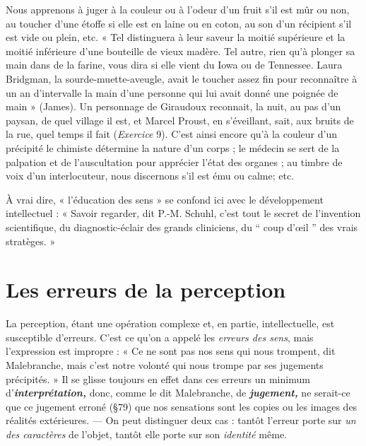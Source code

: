 \vspace{0.24cm}
{\footnotesize 
Nous apprenons à juger à la couleur ou à l’odeur d’un fruit s’il est mûr ou
non, au toucher d’une étoffe si elle est en laine ou en coton, au son d’un
récipient s’il est vide ou plein, etc. « Tel distinguera à leur saveur la moitié
supérieure et la moitié inférieure d’une bouteille de vieux madère. Tel autre,
rien qu’à plonger sa main dans de la farine, vous dira si elle vient du Iowa
ou de Tennessee. Laura Bridgman, la sourde-muette-aveugle, avait le toucher
assez fin pour reconnaître à un an d'intervalle la main d’une personne
qui lui avait donné une poignée de main » (James). Un personnage de
Giraudoux reconnait, la nuit, au pas d’un paysan, de quel village il est, et
Marcel Proust, en s’éveillant, sait, aux bruits de la rue, quel temps il fait
({\it Exercice} 9). C'est ainsi encore qu’à la couleur d’un précipité le chimiste
détermine la nature d’un corps ; le médecin se sert de la palpation et de
l’auscultation pour apprécier l'état des organes ; au timbre de voix d’un
interlocuteur, nous discernons s’il est ému ou calme; etc.}
\vspace{0.31cm}

À vrai dire, « l’éducation des sens » se confond ici avec le développement
intellectuel : « Savoir regarder, dit P.-M. Schuhl, c’est tout
le secret de l’invention scientifique, du diagnostic-éclair des grands
cliniciens, du “ coup d'œil ” des vrais stratèges. »

\section{Les erreurs de la perception}%
La perception, étant une
opération complexe et, en partie, intellectuelle, est susceptible d’erreurs.
C’est ce qu’on a appelé les {\it erreurs des sens}, mais l’expression
est impropre : « Ce ne sont pas nos sens qui nous trompent, dit
Malebranche, mais c'est notre volonté qui nous trompe par ses
jugements précipités. » Il se glisse toujours en effet dans ces erreurs un
minimum d'\textbf{\textit {interprétation,}} donc, comme le dit Malebranche, de
\textbf{\textit {jugement,}} ne serait-ce que ce jugement erroné (\S 79) que nos sensations
sont les copies ou les images des réalités extérieures. — On peut
distinguer deux cas : tantôt l’erreur porte sur {\it un des caractères} de
l’objet, tantôt elle porte sur son {\it identité} même.

